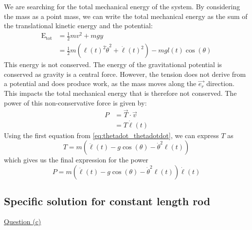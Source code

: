 We are searching for the total mechanical energy of the system. By considering the mass as a point mass, we can write the total mechanical energy as the sum of the translational kinetic energy and the potential:
\begin{equation}
    \begin{aligned}
        \mathrm{E_{tot}} &= \frac{1}{2}mv^2 + mgy \\
        &= \frac{1}{2}m(\ell(t)^2 \dot\theta^2 + \dot\ell(t)^2) - mgl(t)\cos(\theta)
    \end{aligned}
\end{equation}
This energy is not conserved. The energy of the gravitational potential is conserved as gravity is a central force. However, the tension does not derive from a potential and does produce work, as the mass moves along the \(\vec{e_r}\) direction. This impacts the total mechanical energy that is therefore not conserved. The power of this non-conservative force is given by:
\begin{equation}
    \begin{aligned}
        P &= \vec{T} \cdot \vec{v} \\
        &= T \dot\ell(t)
    \end{aligned}
\end{equation}
Using the first equation from \autoref{eq:thetadot_thetadotdot}, we can express \(T\) as
\begin{equation}
    T = m(\ddot\ell(t) - g\cos(\theta) - \dot\theta^2 \ell(t))
\end{equation}
which gives us the final expression for the power
\begin{equation}
    P = m(\ddot\ell(t) - g\cos(\theta) - \dot\theta^2 \ell(t)) \dot\ell(t)
\end{equation}

\subsection{Specific solution for constant length rod}
\label{sec:analytic:constant_length}
\underline{Question (c)}

